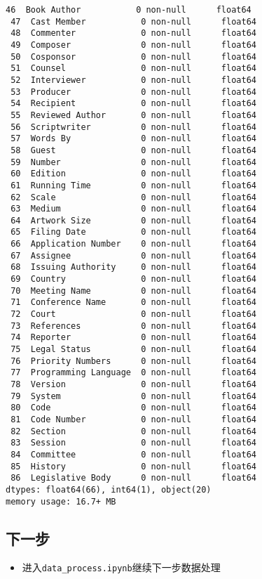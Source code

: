 \documentclass[11pt]{article}
\providecommand{\tightlist}{%
      \setlength{\itemsep}{0pt}\setlength{\parskip}{0pt}}
\begin{document}
\begin{Verbatim}[commandchars=\\\{\}]
 46  Book Author           0 non-null      float64
 47  Cast Member           0 non-null      float64
 48  Commenter             0 non-null      float64
 49  Composer              0 non-null      float64
 50  Cosponsor             0 non-null      float64
 51  Counsel               0 non-null      float64
 52  Interviewer           0 non-null      float64
 53  Producer              0 non-null      float64
 54  Recipient             0 non-null      float64
 55  Reviewed Author       0 non-null      float64
 56  Scriptwriter          0 non-null      float64
 57  Words By              0 non-null      float64
 58  Guest                 0 non-null      float64
 59  Number                0 non-null      float64
 60  Edition               0 non-null      float64
 61  Running Time          0 non-null      float64
 62  Scale                 0 non-null      float64
 63  Medium                0 non-null      float64
 64  Artwork Size          0 non-null      float64
 65  Filing Date           0 non-null      float64
 66  Application Number    0 non-null      float64
 67  Assignee              0 non-null      float64
 68  Issuing Authority     0 non-null      float64
 69  Country               0 non-null      float64
 70  Meeting Name          0 non-null      float64
 71  Conference Name       0 non-null      float64
 72  Court                 0 non-null      float64
 73  References            0 non-null      float64
 74  Reporter              0 non-null      float64
 75  Legal Status          0 non-null      float64
 76  Priority Numbers      0 non-null      float64
 77  Programming Language  0 non-null      float64
 78  Version               0 non-null      float64
 79  System                0 non-null      float64
 80  Code                  0 non-null      float64
 81  Code Number           0 non-null      float64
 82  Section               0 non-null      float64
 83  Session               0 non-null      float64
 84  Committee             0 non-null      float64
 85  History               0 non-null      float64
 86  Legislative Body      0 non-null      float64
dtypes: float64(66), int64(1), object(20)
memory usage: 16.7+ MB
    \end{Verbatim}

    \subsection{下一步}\label{ux4e0bux4e00ux6b65}

\begin{itemize}
\tightlist
\item
  进入\texttt{data\_process.ipynb}继续下一步数据处理
\end{itemize}


    
    
    
\end{document}
